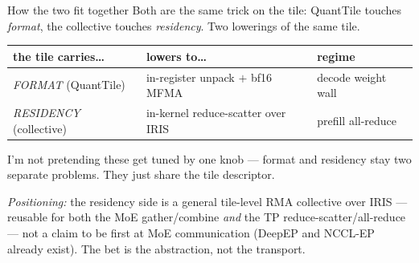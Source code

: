 \documentclass[pdf,aspectratio=169]{beamer}
\newcommand{\empy}[1]{{\color{darkorange}\emph{#1}}}
\newcommand{\empr}[1]{{\color{cardinalred}\emph{#1}}}
\begin{document}
\begin{frame}{How the two fit together}
\small
Both are the same trick on the tile: QuantTile touches \empr{format}, the collective touches \empr{residency}. Two lowerings of the same tile.
\vspace{1ex}
\begin{center}
\footnotesize\setlength{\tabcolsep}{8pt}
\begin{tabular}{l l l}
\toprule
the tile carries\ldots & lowers to\ldots & regime \\
\midrule
\empy{FORMAT} (QuantTile) & in-register unpack $+$ bf16 MFMA & decode weight wall \\
\empy{RESIDENCY} (collective) & in-kernel reduce-scatter over IRIS & prefill all-reduce \\
\bottomrule
\end{tabular}
\end{center}
\vspace{1ex}
I'm not pretending these get tuned by one knob --- format and residency stay two separate problems. They just share the tile descriptor.
\vspace{0.8ex}

{\footnotesize \empy{Positioning:} the residency side is a general tile-level RMA collective over IRIS --- reusable for both the MoE gather/combine \emph{and} the TP reduce-scatter/all-reduce --- not a claim to be first at MoE communication (DeepEP and NCCL-EP already exist). The bet is the abstraction, not the transport.}
\end{frame}
\end{document}

